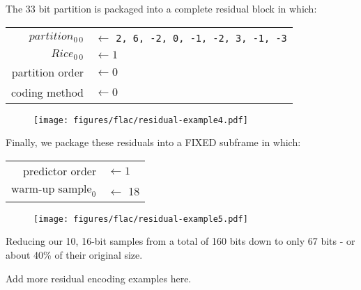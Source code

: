 The 33 bit partition is packaged into a complete residual block
in which:
\newline
\begin{tabular}{rl}
$partition_{0~0}$ & $\leftarrow$ \texttt{2, 6, -2, 0, -1, -2, 3, -1, -3} \\
$Rice_{0~0}$ & $\leftarrow 1$ \\
partition order & $\leftarrow 0$ \\
coding method & $\leftarrow 0$ \\
\end{tabular}
\begin{figure}[h]
\texttt{[image: figures/flac/residual-example4.pdf]}
\end{figure}
\par
Finally, we package these residuals into a FIXED subframe in which:
\newline
\begin{tabular}{rl}
predictor order & $\leftarrow 1$ \\
$\text{warm-up sample}_0$ & $\leftarrow $ 18 \\
\end{tabular}
\begin{figure}[h]
\texttt{[image: figures/flac/residual-example5.pdf]}
\end{figure}
\par
\noindent
Reducing our 10, 16-bit samples from a total of 160 bits
down to only 67 bits - or about 40\% of their original size.

\clearpage

Add more residual encoding examples here.


\clearpage

